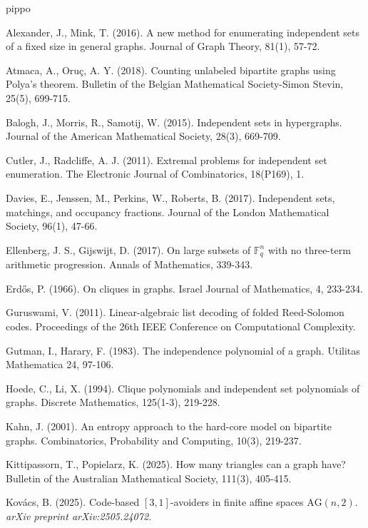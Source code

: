 \documentclass[10pt,a4paper]{article}
\numberwithin{equation}{section}
\begin{document}
{\footnotesize
\begin{thebibliography}{pippo}

 Alexander, J.,  Mink, T. (2016). A new method for enumerating independent sets of a fixed size in general graphs. Journal of Graph Theory, 81(1), 57-72.

 Atmaca, A.,  Oruç, A. Y. (2018). Counting unlabeled bipartite graphs using Polya's theorem. Bulletin of the Belgian Mathematical Society-Simon Stevin, 25(5), 699-715.

 Balogh, J., Morris, R.,  Samotij, W. (2015). Independent sets in hypergraphs. Journal of the American Mathematical Society, 28(3), 669-709.

 Cutler, J.,  Radcliffe, A. J. (2011). Extremal problems for independent set enumeration. The Electronic Journal of Combinatorics, 18(P169), 1.

 Davies, E., Jenssen, M., Perkins, W.,  Roberts, B. (2017). Independent sets, matchings, and occupancy fractions. Journal of the London Mathematical Society, 96(1), 47-66.

Ellenberg, J. S.,  Gijswijt, D. (2017). On large subsets of $\mathbb{F}_q^n$ with no three-term arithmetic progression. Annals of Mathematics, 339-343.

 Erdős, P. (1966). On cliques in graphs. Israel Journal of Mathematics, 4, 233-234.

 Guruswami, V. (2011). Linear-algebraic list decoding of folded Reed-Solomon codes. Proceedings of the 26th IEEE Conference on Computational Complexity.

 Gutman, I., Harary, F.  (1983). The independence polynomial of a graph. Utilitas Mathematica 24, 97-106.

 Hoede, C.,  Li, X. (1994). Clique polynomials and independent set polynomials of graphs. Discrete Mathematics, 125(1-3), 219-228.

 Kahn, J. (2001). An entropy approach to the hard-core model on bipartite graphs. Combinatorics, Probability and Computing, 10(3), 219-237.

 Kittipassorn, T., Popielarz, K. (2025). How many triangles can a graph have? Bulletin of the Australian Mathematical Society, 111(3), 405-415.

 Kovács, B. (2025). Code-based $[3,1]$-avoiders in finite affine spaces $\mathrm{AG}(n,2)$. \textit{arXiv preprint arXiv:2505.24072.}


\end{thebibliography}}
\end{document}
